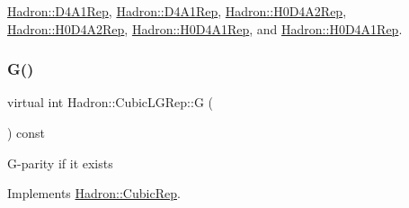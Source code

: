 \mbox{\hyperlink{structHadron_1_1D4A1Rep_a4224f0d47cc0a894a9da4c8505d51c29}{Hadron\+::\+D4\+A1\+Rep}}, \mbox{\hyperlink{structHadron_1_1D4A1Rep_a4224f0d47cc0a894a9da4c8505d51c29}{Hadron\+::\+D4\+A1\+Rep}}, \mbox{\hyperlink{structHadron_1_1H0D4A2Rep_a637522dc6caee2869b2bb632a4c5a5b5}{Hadron\+::\+H0\+D4\+A2\+Rep}}, \mbox{\hyperlink{structHadron_1_1H0D4A2Rep_a637522dc6caee2869b2bb632a4c5a5b5}{Hadron\+::\+H0\+D4\+A2\+Rep}}, \mbox{\hyperlink{structHadron_1_1H0D4A1Rep_ab13ff026da1bc59df4b52835038296d5}{Hadron\+::\+H0\+D4\+A1\+Rep}}, and \mbox{\hyperlink{structHadron_1_1H0D4A1Rep_ab13ff026da1bc59df4b52835038296d5}{Hadron\+::\+H0\+D4\+A1\+Rep}}.

\mbox{\label{structHadron_1_1CubicLGRep_ace26f7b2d55e3a668a14cb9026da5231}} 
\subsubsection{\texorpdfstring{G()}{G()}\hspace{0.1cm}{\footnotesize\ttfamily [2/2]}}
{\footnotesize\ttfamily virtual int Hadron\+::\+Cubic\+L\+G\+Rep\+::G (\begin{DoxyParamCaption}{ }\end{DoxyParamCaption}) const\hspace{0.3cm}{\ttfamily [pure virtual]}}

G-\/parity if it exists 

Implements \mbox{\hyperlink{structHadron_1_1CubicRep_a52104e43266d1614c00bbd1c3b395458}{Hadron\+::\+Cubic\+Rep}}.




